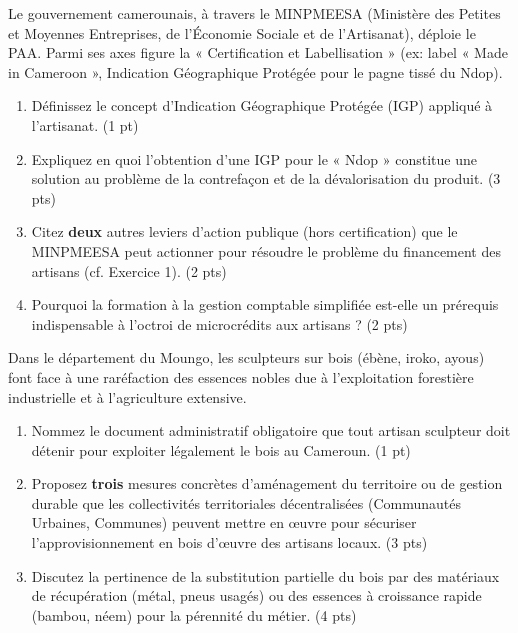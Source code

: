 \documentclass[11pt]{article}
\begin{document}
\begin{exercice}
Le gouvernement camerounais, à travers le MINPMEESA (Ministère des Petites et Moyennes Entreprises, de l'Économie Sociale et de l'Artisanat), déploie le PAA. Parmi ses axes figure la « Certification et Labellisation » (ex: label « Made in Cameroon », Indication Géographique Protégée pour le pagne tissé du Ndop).

\begin{enumerate}
\item Définissez le concept d'Indication Géographique Protégée (IGP) appliqué à l'artisanat. \hfill (1 pt)
\item Expliquez en quoi l'obtention d'une IGP pour le « Ndop » constitue une solution au problème de la contrefaçon et de la dévalorisation du produit. \hfill (3 pts)
\item Citez \textbf{deux} autres leviers d'action publique (hors certification) que le MINPMEESA peut actionner pour résoudre le problème du financement des artisans (cf. Exercice 1). \hfill (2 pts)
\item Pourquoi la formation à la gestion comptable simplifiée est-elle un prérequis indispensable à l'octroi de microcrédits aux artisans ? \hfill (2 pts)
\end{enumerate}
\end{exercice}

\begin{exercice}
Dans le département du Moungo, les sculpteurs sur bois (ébène, iroko, ayous) font face à une raréfaction des essences nobles due à l'exploitation forestière industrielle et à l'agriculture extensive.

\begin{enumerate}
\item Nommez le document administratif obligatoire que tout artisan sculpteur doit détenir pour exploiter légalement le bois au Cameroun. \hfill (1 pt)
\item Proposez \textbf{trois} mesures concrètes d'aménagement du territoire ou de gestion durable que les collectivités territoriales décentralisées (Communautés Urbaines, Communes) peuvent mettre en œuvre pour sécuriser l'approvisionnement en bois d'œuvre des artisans locaux. \hfill (3 pts)
\item Discutez la pertinence de la substitution partielle du bois par des matériaux de récupération (métal, pneus usagés) ou des essences à croissance rapide (bambou, néem) pour la pérennité du métier. \hfill (4 pts)
\end{enumerate}
\end{exercice}
\end{document}
